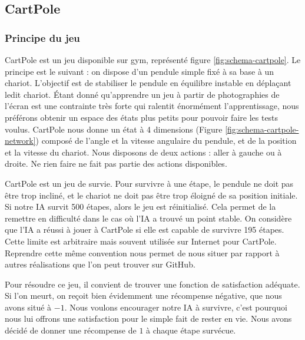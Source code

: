 \subsection{CartPole}

\subsubsection{Principe du jeu}

CartPole est un jeu disponible sur gym, représenté figure \ref{fig:schema-cartpole}. Le principe est le suivant : on dispose d'un pendule simple fixé à sa base à un chariot. L'objectif est de stabiliser
le pendule en équilibre instable en déplaçant ledit chariot. Étant donné qu'apprendre un jeu à partir de photographies de l'écran est une contrainte très forte 
qui ralentit énormément l'apprentissage, nous préférons obtenir un espace des états plus petits pour pouvoir faire les tests voulus. CartPole nous donne un 
état à 4 dimensions (Figure \ref{fig:schema-cartpole-network}) composé de l'angle et la vitesse angulaire du pendule, et de la position et la vitesse du chariot.
Nous disposons de deux actions : aller à gauche ou à droite. Ne rien faire ne fait pas partie des actions disponibles.

CartPole est un jeu de survie. Pour survivre à une étape, le pendule ne doit pas être trop incliné, et le chariot ne doit pas être trop éloigné de sa position
initiale. Si notre IA survit 500 étapes, alors le jeu est réinitialisé. Cela permet de la remettre en difficulté dans le cas où l'IA a trouvé un
point stable. On considère que l'IA a réussi à jouer à CartPole si elle est capable de survivre 195 étapes. Cette limite est arbitraire mais souvent utilisée sur
Internet pour CartPole. Reprendre cette même convention nous permet de nous situer par rapport à autres réalisations que l'on peut trouver sur GitHub.

Pour résoudre ce jeu, il convient de trouver une fonction de satisfaction adéquate. Si l'on meurt, on reçoit bien évidemment une récompense négative, que nous
avons situé à $-1$. Nous voulons encourager notre IA à survivre, c'est pourquoi nous lui offrons une satisfaction pour le simple fait de rester en vie. Nous avons
décidé de donner une récompense de $1$ à chaque étape survécue.


